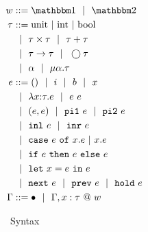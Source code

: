 %


\begin{figure}
\centering
$\begin{aligned}
\world &::= \bbone \gbar \bbtwo \\
\type &::= \text{unit}~|~\text{int}~|~\text{bool} \\
&\gbar \type \times \type 
 \gbar \type + \type \\
&\gbar \type \to \type
 \gbar \fut \type \\
&\gbar \alpha \gbar \mu \alpha.\tau \\
\expr &::= ()\gbar\inte\gbar\bool\gbar \var  \\
&\gbar \lam{\var}{\type}{\expr} 
 \gbar \expr~\expr \\
&\gbar (\expr, \expr) 
 \gbar \pio~\expr 
 \gbar \pit~\expr \\
&\gbar \inl~\expr 
 \gbar \inr~\expr \\
&\gbar \caseof {\expr}{\var.\expr}{\var.\expr} \\
&\gbar \ifthen {\expr}{\expr}{\expr} \\
&\gbar \letin{\var}{\expr}{\expr} \\
&\gbar \next~\expr 
 \gbar \prev~\expr 
 \gbar \pause~\expr \\
\context &::=\emptyC \gbar \context, \colwor \var \type
\end{aligned} $
\caption{\lamStaged~Syntax}
\label{fig:lamStagedSyntax}
\end{figure}